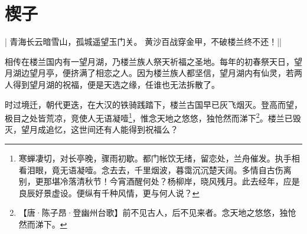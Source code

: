 \chapter*{楔子}
\label{chap:preface}

\begin{pcontent}{|}
青海长云暗雪山，孤城遥望玉门关。
黄沙百战穿金甲，不破楼兰终不还！||
\end{pcontent}

相传在楼兰国内有一望月湖，乃楼兰族人祭天祈福之圣地。每年的初春祭天日，望月湖边望月亭，便挤满了相恋之人。因为楼兰族人都坚信，望月湖内有仙灵，若两人得到望月湖的祝福，便是天选之缘，任谁也无法拆散了。

时过境迁，朝代更迭，在大汉的铁骑践踏下，楼兰古国早已灰飞烟灭。登高而望，极目之处皆荒凉，竞使人无语凝噎\footnote{寒蝉凄切，对长亭晚，骤雨初歇。都门帐饮无绪，留恋处，兰舟催发。执手相看泪眼，竟无语凝噎。念去去，千里烟波，暮霭沉沉楚天阔。\cispace 多情自古伤离别，更那堪冷落清秋节！今宵酒醒何处？杨柳岸，晓风残月。此去经年，应是良辰好景虚设。便纵有千种风情，更与何人说？}，惟念天地之悠悠，独怆然而涕下\footnote{【唐·陈子昂·登幽州台歌】前不见古人，后不见来者。念天地之悠悠，独怆然而涕下。}。楼兰已毁灭，望月成追忆，这世间还有人能得到祝福么？



